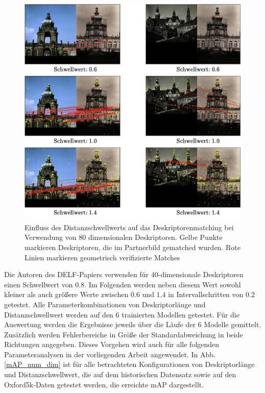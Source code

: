 \begin{figure}[H]
\centering
\includegraphics[scale=0.86]{influence_threshold}
\caption{Einfluss des Distanzschwellwerts auf das Deskriptorenmatching bei Verwendung von $80$ dimensionalen Deskriptoren. Gelbe Punkte markieren Deskriptoren, die im Partnerbild gematched wurden. Rote Linien markieren geometrisch verifizierte Matches}
\label{influence_threshold}
\end{figure}

Die Autoren des DELF-Papiers \cite{delf} verwenden für $40$-dimensionale Deskriptoren einen Schwellwert von $0.8$. 
Im Folgenden werden neben diesem Wert sowohl kleiner als auch größere Werte zwischen $0.6$ und $1.4$ in Intervallschritten von $0.2$ getestet. Alle Parameterkombinationen von Deskriptorlänge und Distanzschwellwert werden auf den $6$ trainierten Modellen getestet. Für die Auswertung werden die Ergebnisse jeweils über die Läufe der $6$ Modelle gemittelt. Zusätzlich werden Fehlerbereiche in Größe der Standardabweichung in beide Richtungen angegeben. Dieses Vorgehen wird auch für alle folgenden Parameteranalysen in der vorliegenden Arbeit angewendet. In Abb. \ref{mAP_num_dim} ist für alle betrachteten Konfigurationen von Deskriptorlänge und Distanzschwellwert, die auf dem historischen Datensatz sowie auf den Oxford5k-Daten getestet werden, die erreichte mAP dargestellt.

